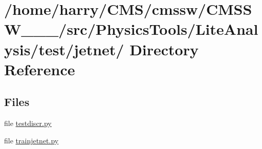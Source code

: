 \hypertarget{dir_000003}{
\section{/home/harry/CMS/cmssw/CMSSW\_\_\_/src/Physics\-Tools/Lite\-Analysis/test/jetnet/ Directory Reference}
\label{dir_000003}
}


\subsection*{Files}
\begin{CompactItemize}
\item 
file \hyperlink{testdiscr_8py}{testdiscr.py}
\item 
file \hyperlink{trainjetnet_8py}{trainjetnet.py}
\end{CompactItemize}
